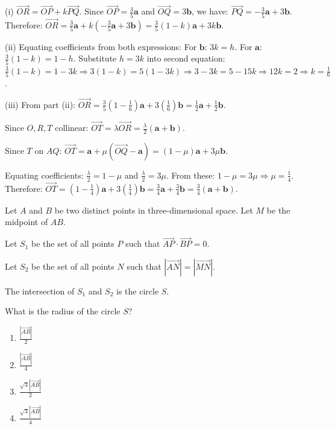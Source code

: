 \begin{solution}[Sketch]
(i) $\overrightarrow{OR} = \overrightarrow{OP} + k\overrightarrow{PQ}$. Since $\overrightarrow{OP} = \frac{3}{5}\mathbf{a}$ and $\overrightarrow{OQ} = 3\mathbf{b}$, we have:
$\overrightarrow{PQ} = -\frac{3}{5}\mathbf{a} + 3\mathbf{b}$.
Therefore: $\overrightarrow{OR} = \frac{3}{5}\mathbf{a} + k(-\frac{3}{5}\mathbf{a} + 3\mathbf{b}) = \frac{3}{5}(1-k)\mathbf{a} + 3k\mathbf{b}$.

(ii) Equating coefficients from both expressions:
For $\mathbf{b}$: $3k = h$.
For $\mathbf{a}$: $\frac{3}{5}(1-k) = 1-h$.
Substitute $h = 3k$ into second equation: $\frac{3}{5}(1-k) = 1-3k \Rightarrow 3(1-k) = 5(1-3k) \Rightarrow 3-3k = 5-15k \Rightarrow 12k = 2 \Rightarrow k = \frac{1}{6}$.

(iii) From part (ii): $\overrightarrow{OR} = \frac{3}{5}(1-\frac{1}{6})\mathbf{a} + 3(\frac{1}{6})\mathbf{b} = \frac{1}{2}\mathbf{a} + \frac{1}{2}\mathbf{b}$.

Since $O, R, T$ collinear: $\overrightarrow{OT} = \lambda\overrightarrow{OR} = \frac{\lambda}{2}(\mathbf{a} + \mathbf{b})$.

Since $T$ on $AQ$: $\overrightarrow{OT} = \mathbf{a} + \mu(\overrightarrow{OQ} - \mathbf{a}) = (1-\mu)\mathbf{a} + 3\mu\mathbf{b}$.

Equating coefficients: $\frac{\lambda}{2} = 1-\mu$ and $\frac{\lambda}{2} = 3\mu$.
From these: $1-\mu = 3\mu \Rightarrow \mu = \frac{1}{4}$.
Therefore: $\overrightarrow{OT} = (1-\frac{1}{4})\mathbf{a} + 3(\frac{1}{4})\mathbf{b} = \frac{3}{4}\mathbf{a} + \frac{3}{4}\mathbf{b} = \frac{3}{4}(\mathbf{a} + \mathbf{b})$.
\end{solution}

\vspace{1em}

\begin{problem}
Let $A$ and $B$ be two distinct points in three-dimensional space. Let $M$ be the midpoint of $AB$.

Let $S_1$ be the set of all points $P$ such that $\overrightarrow{AP} \cdot \overrightarrow{BP} = 0$.

Let $S_2$ be the set of all points $N$ such that $\left| \overrightarrow{AN} \right| = \left| \overrightarrow{MN} \right|$.

The intersection of $S_1$ and $S_2$ is the circle $S$.

What is the radius of the circle $S$?

\begin{enumerate}[label=\Alph*.]
    \item $\displaystyle \frac{\left| \overrightarrow{AB} \right|}{2}$
    \item $\displaystyle \frac{\left| \overrightarrow{AB} \right|}{4}$
    \item $\displaystyle \frac{\sqrt{3} \left| \overrightarrow{AB} \right|}{2}$
    \item $\displaystyle \frac{\sqrt{3} \left| \overrightarrow{AB} \right|}{4}$
\end{enumerate}
\end{problem}

